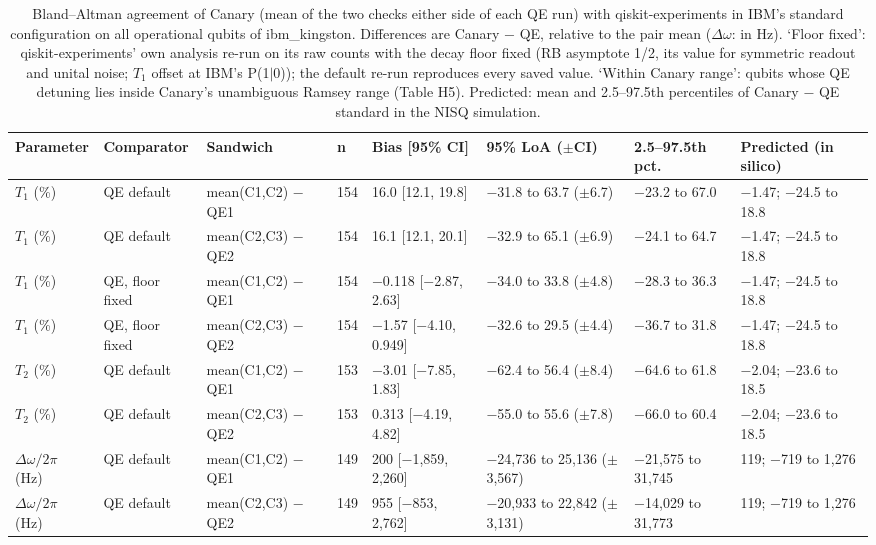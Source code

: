 \begin{table}[!t]
\centering
\footnotesize
\caption{Bland--Altman agreement of Canary (mean of the two checks either side of each QE run) with qiskit-experiments in IBM's standard configuration on all operational qubits of ibm\_kingston. Differences are Canary $-$ QE, relative to the pair mean ($\Delta\omega$: in Hz). `Floor fixed': qiskit-experiments' own analysis re-run on its raw counts with the decay floor fixed (RB asymptote 1/2, its value for symmetric readout and unital noise; $T_1$ offset at IBM's P(1$|$0)); the default re-run reproduces every saved value. `Within Canary range': qubits whose QE detuning lies inside Canary's unambiguous Ramsey range (Table H5). Predicted: mean and 2.5--97.5th percentiles of Canary $-$ QE standard in the NISQ simulation.}
\label{tab:h1}
\begin{adjustbox}{max width=\linewidth}
\begin{tabular}{llllllll}
\hline
Parameter & Comparator & Sandwich & n & Bias [95\% CI] & 95\% LoA ($\pm$CI) & 2.5--97.5th pct. & Predicted (in silico) \\
\hline
$T_1$ (\%) & QE default & mean(C1,C2) $-$ QE1 & 154 & 16.0 [12.1, 19.8] & $-$31.8 to 63.7 ($\pm$6.7) & $-$23.2 to 67.0 & $-$1.47; $-$24.5 to 18.8 \\
$T_1$ (\%) & QE default & mean(C2,C3) $-$ QE2 & 154 & 16.1 [12.1, 20.1] & $-$32.9 to 65.1 ($\pm$6.9) & $-$24.1 to 64.7 & $-$1.47; $-$24.5 to 18.8 \\
$T_1$ (\%) & QE, floor fixed & mean(C1,C2) $-$ QE1 & 154 & $-$0.118 [$-$2.87, 2.63] & $-$34.0 to 33.8 ($\pm$4.8) & $-$28.3 to 36.3 & $-$1.47; $-$24.5 to 18.8 \\
$T_1$ (\%) & QE, floor fixed & mean(C2,C3) $-$ QE2 & 154 & $-$1.57 [$-$4.10, 0.949] & $-$32.6 to 29.5 ($\pm$4.4) & $-$36.7 to 31.8 & $-$1.47; $-$24.5 to 18.8 \\
$T_2$ (\%) & QE default & mean(C1,C2) $-$ QE1 & 153 & $-$3.01 [$-$7.85, 1.83] & $-$62.4 to 56.4 ($\pm$8.4) & $-$64.6 to 61.8 & $-$2.04; $-$23.6 to 18.5 \\
$T_2$ (\%) & QE default & mean(C2,C3) $-$ QE2 & 153 & 0.313 [$-$4.19, 4.82] & $-$55.0 to 55.6 ($\pm$7.8) & $-$66.0 to 60.4 & $-$2.04; $-$23.6 to 18.5 \\
$\Delta\omega/2\pi$ (Hz) & QE default & mean(C1,C2) $-$ QE1 & 149 & 200 [$-$1,859, 2,260] & $-$24,736 to 25,136 ($\pm$3,567) & $-$21,575 to 31,745 & 119; $-$719 to 1,276 \\
$\Delta\omega/2\pi$ (Hz) & QE default & mean(C2,C3) $-$ QE2 & 149 & 955 [$-$853, 2,762] & $-$20,933 to 22,842 ($\pm$3,131) & $-$14,029 to 31,773 & 119; $-$719 to 1,276 \\

\end{tabular}
\end{adjustbox}
\end{table}
